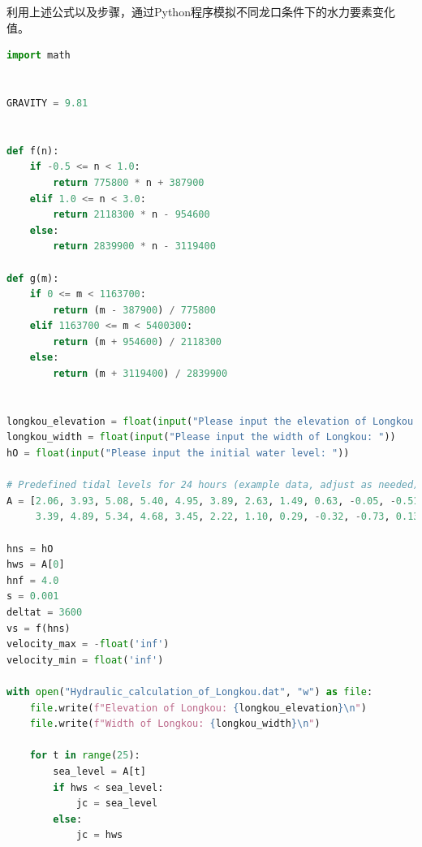 \documentclass[UTF8, a4paper, 12pt]{ctexart} %
\begin{document}
\par 
利用上述公式以及步骤，通过Python程序模拟不同龙口条件下的水力要素变化值。
\begin{lstlisting}[language=Python]
import math


GRAVITY = 9.81


def f(n):
    if -0.5 <= n < 1.0:
        return 775800 * n + 387900
    elif 1.0 <= n < 3.0:
        return 2118300 * n - 954600
    else:
        return 2839900 * n - 3119400

def g(m):
    if 0 <= m < 1163700:
        return (m - 387900) / 775800
    elif 1163700 <= m < 5400300:
        return (m + 954600) / 2118300
    else:
        return (m + 3119400) / 2839900


longkou_elevation = float(input("Please input the elevation of Longkou: "))
longkou_width = float(input("Please input the width of Longkou: "))
hO = float(input("Please input the initial water level: "))

# Predefined tidal levels for 24 hours (example data, adjust as needed)
A = [2.06, 3.93, 5.08, 5.40, 4.95, 3.89, 2.63, 1.49, 0.63, -0.05, -0.51, 0.02, 1.61,
     3.39, 4.89, 5.34, 4.68, 3.45, 2.22, 1.10, 0.29, -0.32, -0.73, 0.13, 2.06]

hns = hO
hws = A[0]
hnf = 4.0
s = 0.001
deltat = 3600
vs = f(hns)
velocity_max = -float('inf')
velocity_min = float('inf')

with open("Hydraulic_calculation_of_Longkou.dat", "w") as file:
    file.write(f"Elevation of Longkou: {longkou_elevation}\n")
    file.write(f"Width of Longkou: {longkou_width}\n")

    for t in range(25):
        sea_level = A[t]
        if hws < sea_level:
            jc = sea_level
        else:
            jc = hws
        

\end{lstlisting}
\end{document}
